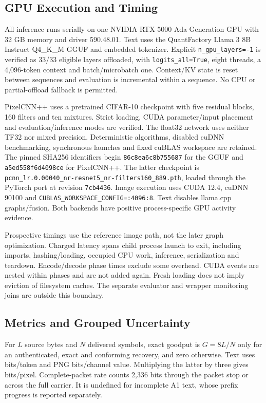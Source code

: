 \documentclass[a4paper,twoside]{article}
\begin{document}
\subsection{GPU Execution and Timing}
\label{sec:hardware}
All inference runs serially on one NVIDIA RTX 5000 Ada Generation GPU with 32 GB memory and driver 590.48.01. Text uses the QuantFactory Llama 3 8B Instruct Q4\_K\_M GGUF and embedded tokenizer. Explicit \texttt{n\_gpu\_layers=-1} is verified as 33/33 eligible layers offloaded, with \texttt{logits\_all=True}, eight threads, a 4,096-token context and batch/microbatch one. Context/KV state is reset between sequences and evaluation is incremental within a sequence. No CPU or partial-offload fallback is permitted.

PixelCNN++ uses a pretrained CIFAR-10 checkpoint with five residual blocks, 160 filters and ten mixtures. Strict loading, CUDA parameter/input placement and evaluation/inference modes are verified. The float32 network uses neither TF32 nor mixed precision. Deterministic algorithms, disabled cuDNN benchmarking, synchronous launches and fixed cuBLAS workspace are retained. The pinned SHA256 identifiers begin \texttt{86c8ea6c8b755687} for the GGUF and \texttt{a5ed558f6d4098ce} for PixelCNN++. The latter checkpoint is \texttt{pcnn\_lr.0.00040\_}\allowbreak\texttt{nr-resnet5\_nr-filters160\_889.pth}, loaded through the PyTorch port at revision \texttt{7cb4436}. Image execution uses CUDA 12.4, cuDNN 90100 and \texttt{CUBLAS\_WORKSPACE\_CONFIG=:4096:8}. Text disables llama.cpp graphs/fusion. Both backends have positive process-specific GPU activity evidence.

Prospective timings use the reference image path, not the later graph optimization. Charged latency spans child process launch to exit, including imports, hashing/loading, occupied CPU work, inference, serialization and teardown. Encode/decode phase times exclude some overhead. CUDA events are nested within phases and are not added again. Fresh loading does not imply eviction of filesystem caches. The separate evaluator and wrapper monitoring joins are outside this boundary.

\subsection{Metrics and Grouped Uncertainty}
For $L$ source bytes and $N$ delivered symbols, exact goodput is $G=8L/N$ only for an authenticated, exact and conforming recovery, and zero otherwise. Text uses bits/token and PNG bits/channel value. Multiplying the latter by three gives bits/pixel. Complete-packet rate counts 2,336 bits through the packet stop or across the full carrier. It is undefined for incomplete A1 text, whose prefix progress is reported separately.
\end{document}
